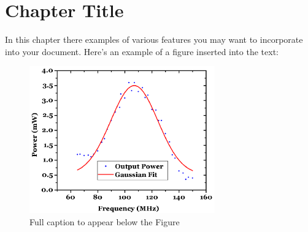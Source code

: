 
\cleardoublepage


\chapter{Chapter Title}
\label{makereference1}

In this chapter there examples of various features you may want to
incorporate into your document. Here's an example of a figure
inserted into the text:

\begin{figure}[htb]%

    \includegraphics[height=2.5in]{tex/figures/graph.png}

    \caption[Optional: Short caption to appear in List of
    Figures]{Full caption to appear below the Figure}

    \label{figure1}
\end{figure}


